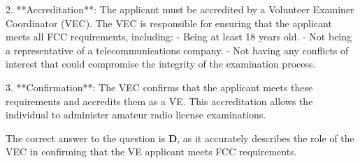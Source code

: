 2. **Accreditation**: The applicant must be accredited by a Volunteer Examiner Coordinator (VEC). The VEC is responsible for ensuring that the applicant meets all FCC requirements, including:
   - Being at least 18 years old.
   - Not being a representative of a telecommunications company.
   - Not having any conflicts of interest that could compromise the integrity of the examination process.

3. **Confirmation**: The VEC confirms that the applicant meets these requirements and accredits them as a VE. This accreditation allows the individual to administer amateur radio license examinations.

The correct answer to the question is \textbf{D}, as it accurately describes the role of the VEC in confirming that the VE applicant meets FCC requirements.

